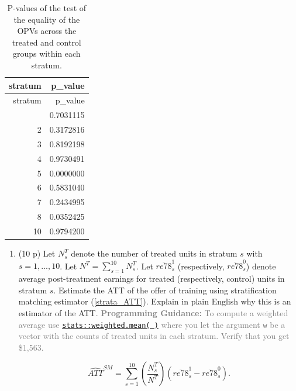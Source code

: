 \documentclass[
]{article}
\newenvironment{Shaded}{\begin{snugshade}}{\end{snugshade}}
\newcommand{\AttributeTok}[1]{\textcolor[rgb]{0.13,0.29,0.53}{#1}}
\newcommand{\DecValTok}[1]{\textcolor[rgb]{0.00,0.00,0.81}{#1}}
\newcommand{\FunctionTok}[1]{\textcolor[rgb]{0.13,0.29,0.53}{\textbf{#1}}}
\newcommand{\NormalTok}[1]{#1}
\newcommand{\OtherTok}[1]{\textcolor[rgb]{0.56,0.35,0.01}{#1}}
\newcommand{\SpecialCharTok}[1]{\textcolor[rgb]{0.81,0.36,0.00}{\textbf{#1}}}
\newcommand{\StringTok}[1]{\textcolor[rgb]{0.31,0.60,0.02}{#1}}
\begin{document}
\begin{Shaded}
\end{Shaded}

\begin{longtable}[]{@{}rr@{}}
\caption{P-values of the test of the equality of the OPVs across the
treated and control groups within each stratum.}\tabularnewline
\toprule\noalign{}
stratum & p\_value \\
\midrule\noalign{}
\endfirsthead
\toprule\noalign{}
stratum & p\_value \\
\midrule\noalign{}
\endhead
\bottomrule\noalign{}
\endlastfoot
1 & 0.7031115 \\
2 & 0.3172816 \\
3 & 0.8192198 \\
4 & 0.9730491 \\
5 & 0.0000000 \\
6 & 0.5831040 \\
7 & 0.2434995 \\
8 & 0.0352425 \\
10 & 0.9794200 \\
\end{longtable}

\begin{enumerate}
\def\labelenumi{\alph{enumi}.}
\setcounter{enumi}{2}
\item
  (10 p) Let \(N_{s}^{T}\) denote the number of treated units in stratum
  \(s\) with \(s=1,...,10\). Let \(N^{T}=\sum_{s=1}^{10}N_{s}^{T}\). Let
  \(\overline{re78}_{s}^{1}\) (respectively,
  \(\overline{re78}_{s}^{0}\)) denote average post-treatment earnings
  for treated (respectively, control) units in stratum \(s\). Estimate
  the ATT of the offer of training using stratification matching
  estimator (\ref{strata_ATT}). Explain in plain English why this is an
  estimator of the ATT.
  \textcolor{gray}{\textbf{Programming Guidance:} To compute a weighted average use \href{https://www.rdocumentation.org/packages/stats/versions/3.6.2/topics/weighted.mean}{\texttt{stats::weighted.mean( )}} where you let the argument \texttt{w} be a vector with the counts of treated units in each stratum. Verify that you get \$1,563.}\label{item:naive-ATT-estimate}

  \begin{equation}
   \widehat{ATT}^{SM}=\sum_{s=1}^{10}\left( \frac{N_{s}^{T}}{N^{T}}\right) \left( \overline{re78}_{s}^{1}-\overline{re78}_{s}^{0}\right) 
   \text{.}\label{strata_ATT}
   \end{equation}
\end{enumerate}
\end{document}
